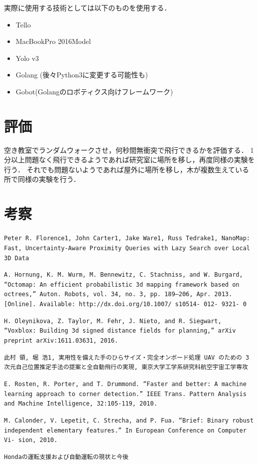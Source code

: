 \documentclass[a4j,10pt]{jsarticle}
\begin{document}
実際に使用する技術としては以下のものを使用する．
\begin{itemize}
\item Tello
\item MacBookPro 2016Model
\item Yolo v3
\item Golang (後々Python3に変更する可能性も)
\item Gobot(Golangのロボティクス向けフレームワーク)
\end{itemize}

\section{評価}
空き教室でランダムウォークさせ，何秒間無衝突で飛行できるかを評価する．
1分以上問題なく飛行できるようであれば研究室に場所を移し，再度同様の実験を行う．
それでも問題ないようであれば屋外に場所を移し，木が複数生えている所で同様の実験を行う．

\section{考察}


\begin{thebibliography}{99}
\texttt{Peter R. Florence1, John Carter1, Jake Ware1, Russ Tedrake1, NanoMap: Fast, Uncertainty-Aware Proximity Queries with Lazy Search over Local 3D Data}

\texttt{A. Hornung, K. M. Wurm, M. Bennewitz, C. Stachniss, and W. Burgard, “Octomap: An efficient probabilistic 3d mapping framework based on octrees,” Auton. Robots, vol. 34, no. 3, pp. 189–206, Apr. 2013. [Online]. Available: http://dx.doi.org/10.1007/ s10514- 012- 9321- 0}

\texttt{H. Oleynikova, Z. Taylor, M. Fehr, J. Nieto, and R. Siegwart, “Voxblox: Building 3d signed distance fields for planning,” arXiv preprint arXiv:1611.03631, 2016.}

\texttt{此村 領, 堀 浩1, 実用性を備えた手のひらサイズ・完全オンボード処理 UAV のための 3 次元自己位置推定手法の提案と全自動飛行の実現, 東京大学工学系研究科航空宇宙工学専攻}

\texttt{E. Rosten, R. Porter, and T. Drummond. “Faster and better: A machine learning approach to corner detection.” IEEE Trans. Pattern Analysis and Machine Intelligence, 32:105-119, 2010.}

\texttt{M. Calonder, V. Lepetit, C. Strecha, and P. Fua. “Brief: Binary robust independent elementary features.” In European Conference on Computer Vi- sion, 2010.}

\texttt{Hondaの運転支援および自動運転の現状と今後}

\end{thebibliography}
\end{document}
